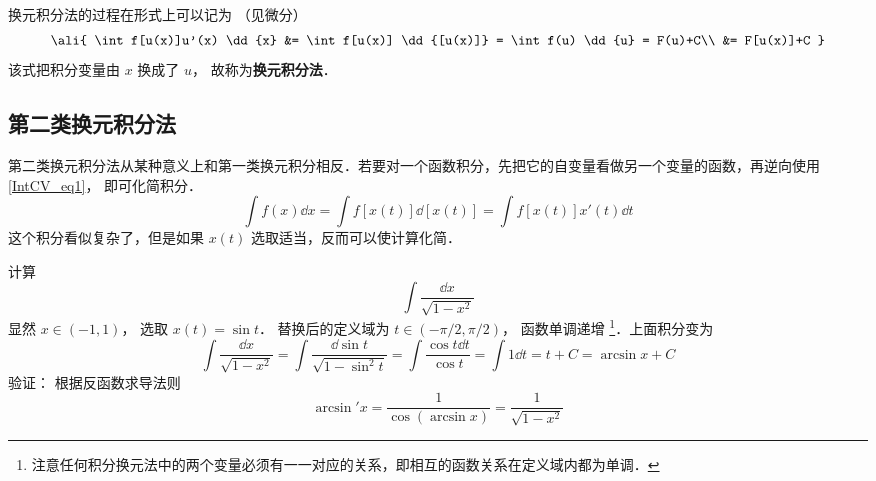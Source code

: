 换元积分法的过程在形式上可以记为 （见微分）
\begin{equation}\label{IntCV_eq1}
\ali{
\int f[u(x)]u'(x) \dd{x} &= \int f[u(x)] \dd{[u(x)]} = \int f(u) \dd{u} = F(u)+C\\
&= F[u(x)]+C
}\end{equation}
该式把积分变量由 $x$ 换成了 $u$， 故称为\textbf{换元积分法}．

\subsection{第二类换元积分法}
第二类换元积分法从某种意义上和第一类换元积分相反．若要对一个函数积分，先把它的自变量看做另一个变量的函数，再逆向使用\autoref{IntCV_eq1}， 即可化简积分．
\begin{equation}\label{IntCV_eq6}
\int f(x) \dd{x} = \int f[x(t)] \dd{[x(t)]} = \int f[x(t)]x'(t) \dd{t}
\end{equation}
这个积分看似复杂了，但是如果 $x(t)$ 选取适当，反而可以使计算化简．

\begin{exam}{}
计算
\begin{equation}
\int \frac{\dd{x}}{\sqrt{1-x^2}}
\end{equation}
显然 $x \in ( - 1,1)$， 选取 $x(t)=\sin t$． 替换后的定义域为 $t \in ( -\pi/2,\pi/2)$， 函数单调递增 \footnote{注意任何积分换元法中的两个变量必须有一一对应的关系，即相互的函数关系在定义域内都为单调．}．上面积分变为
\begin{equation}
\int \frac{\dd{x}}{\sqrt{1-x^2}}  = \int \frac{\dd{\sin t}}{\sqrt{1-\sin^2 t}} = \int \frac{\cos t\dd{t}}{\cos t}  = \int 1\dd{t}  = t + C = \arcsin x + C
\end{equation}
验证： 根据反函数求导法则
\begin{equation}
\arcsin'x = \frac{1}{\cos(\arcsin x)} = \frac{1}{\sqrt {1 - {x^2}} }
\end{equation}
\end{exam}




